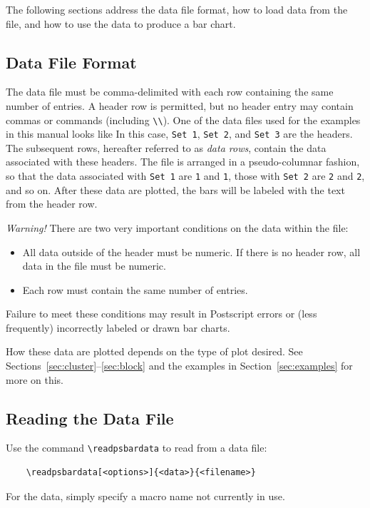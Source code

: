 \documentclass[11pt,english,BCOR=10mm,DIV=14,bibliography=totoc,parskip=false,headings=small,
    headinclude=false,footinclude=false,twoside]{pst-doc}
\begin{document}
    The following sections address the data file format, how to load data from
    the file, and how to use the data to produce a bar chart.

    \subsection{Data File Format}
      The data file must be comma-delimited with each row containing the same
      number of entries. A header row is permitted, but no header entry may
      contain commas or  commands (including \verb|\\|). One of the
      data files used for the examples in this manual looks like
      In this case, \verb|Set 1|, \verb|Set 2|, and \verb|Set 3| are the
      headers. The subsequent rows, hereafter referred to as \emph{data rows},
      contain the data associated with these headers. The file is arranged in a
      pseudo-columnar fashion, so that the data associated with \verb|Set 1|
      are \verb|1| and \verb|1|, those with \verb|Set 2| are \verb|2| and
      \verb|2|, and so on. After these data are plotted, the bars will be
      labeled with the text from the header row.

      \emph{Warning!} There are two very important conditions on the data
      within the file:
      \begin{itemize}
        \item All data outside of the header must be numeric. If there is no
          header row, all data in the file must be numeric.
        \item Each row must contain the same number of entries.
      \end{itemize}
      Failure to meet these conditions may result in Postscript errors or (less
      frequently) incorrectly labeled or drawn bar charts.

      How these data are plotted depends on the type of plot desired. See
      Sections~\ref{sec:cluster}--\ref{sec:block} and the examples in
      Section~\ref{sec:examples} for more on this.

    \subsection{Reading the Data File}
      Use the command \verb|\readpsbardata| to read from a data file:
      \begin{verbatim}
    \readpsbardata[<options>]{<data>}{<filename>}\end{verbatim}
      For the data, simply specify a macro name not currently in use.
\end{document}
